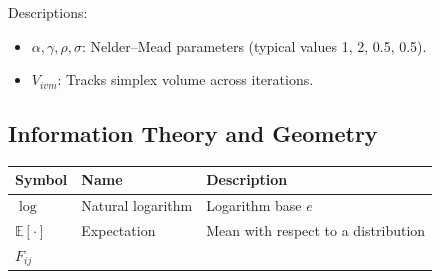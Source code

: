 \documentclass[
  10pt,
]{article}
\providecommand{\tightlist}{%
  \setlength{\itemsep}{0pt}\setlength{\parskip}{0pt}}
\begin{document}
Descriptions:

\begin{itemize}
\tightlist
\item
  \(\alpha,\gamma,\rho,\sigma\): Nelder--Mead parameters (typical values
  1, 2, 0.5, 0.5).
\item
  \(V_{ivm}\): Tracks simplex volume across iterations.
\end{itemize}

\hypertarget{information-theory-and-geometry}{%
\subsection{Information Theory and
Geometry}\label{information-theory-and-geometry}}

\begin{longtable}[]{@{}lll@{}}
\toprule
\begin{minipage}[b]{0.30\columnwidth}\raggedright
Symbol\strut
\end{minipage} & \begin{minipage}[b]{0.30\columnwidth}\raggedright
Name\strut
\end{minipage} & \begin{minipage}[b]{0.30\columnwidth}\raggedright
Description\strut
\end{minipage}\tabularnewline
\midrule
\endhead
\begin{minipage}[t]{0.30\columnwidth}\raggedright
\(\log\)\strut
\end{minipage} & \begin{minipage}[t]{0.30\columnwidth}\raggedright
Natural logarithm\strut
\end{minipage} & \begin{minipage}[t]{0.30\columnwidth}\raggedright
Logarithm base \(e\)\strut
\end{minipage}\tabularnewline
\begin{minipage}[t]{0.30\columnwidth}\raggedright
\(\mathbb{E}[\cdot]\)\strut
\end{minipage} & \begin{minipage}[t]{0.30\columnwidth}\raggedright
Expectation\strut
\end{minipage} & \begin{minipage}[t]{0.30\columnwidth}\raggedright
Mean with respect to a distribution\strut
\end{minipage}\tabularnewline
\begin{minipage}[t]{0.30\columnwidth}\raggedright
\(F_{ij}\)\strut
\end{minipage} & \begin{minipage}[t]{0.30\columnwidth}\raggedright

\end{minipage}
\end{longtable}
\end{document}
